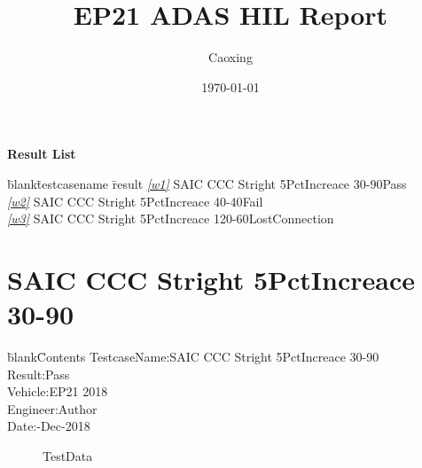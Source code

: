 \documentclass[12pt]{report}
\title{EP21 ADAS HIL Report}
\author{Caoxing}
\date{\today}
\begin{document}
 
\maketitle 
\centerline{\Large{\textbf{Result List}}} 
\begin{CJK}{GBK}{kai} 
\begin{tabbing} 
\hspace*{30bp}\=blank\hspace*{30bp}\=testcasename\hspace*{200bp} \=result\kill 
\>\textit{\underline{\ref{w1}}} \>SAIC CCC Stright 5PctIncreace 30-90\>Pass\\ 
\>\textit{\underline{\ref{w2}}} \>SAIC CCC Stright 5PctIncreace 40-40\>\textcolor[rgb]{1,0,0}{Fail}\\ 
\>\textit{\underline{\ref{w3}}} \>SAIC CCC Stright 5PctIncreace 120-60\>\textcolor[rgb]{1,1,0}{LostConnection}\\ 
\end{tabbing} 
\end{CJK} 
\newpage 
\section{SAIC CCC Stright 5PctIncreace 30-90} 
\begin{CJK}{GBK}{kai} 
\begin{tabbing} 
\hspace*{40bp}\=blank\hspace*{80bp}\=Contents\kill 
 \>TestcaseName:\>SAIC CCC Stright 5PctIncreace 30-90\\ 
 \>Result:\>Pass\\ 
 \>Vehicle:\>EP21 2018\\ 
 \>Engineer:\>Author\\ 
 \>Date:-Dec-2018\\ 
\end{tabbing} 
\end{CJK} 
\label{w1} 
\begin{figure}[h!]  
\centering  
{} 
 
\caption{TestData} 
\end{figure} 
\newpage 
\end{document}

